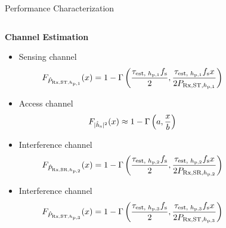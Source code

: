\documentclass[12pt]{beamer}
\newcommand{\fs}[2]{\fontsize{#1 pt}{#2}\selectfont}
\begin{document}
\begin{frame}{Performance Characterization}
        \vspace{-0.8cm}
        \fs{8}{8}
		\begin{columns}[t]
                \begin{column}{0.52 \paperwidth}
		\begin{center}	%
			\textbf{Channel Estimation} 
			\begin{itemize}
       		 	\fs{8}{8}
                	     \item Sensing channel
            		\vspace{-0.2cm}     
			\begin{align*}
			    	 F_{\hat{P}_{\text{Rx,ST,$h_{\text{p,1}}$}}}(x) = 1 - \Gamma \left( \frac{\tau_{\text{est, $h_{\text{p,1}}$}} f_{\text{s}}}{2}, \frac{\tau_{\text{est, $h_{\text{p,1}}$}} f_{\text{s}} x}{2 P_{\text{Rx,ST,$h_{\text{p,1}}$}}} \right) 
		     	     \end{align*}
		     	\item Access channel	
            		\vspace{-0.2cm}     
                     	\begin{align*}
		   		F_{|\hat{h}_{\text{s}}|^2}(x) \approx 1 - \Gamma \left(a, \frac{x}{b} \right)   
		     	\end{align*}
		     	\item Interference channel	
            		\vspace{-0.2cm}     
                     	\begin{align*}
		   		F_{\hat{P}_{\text{Rx,SR,$h_{\text{p,2}}$}}}(x) = 1 - \Gamma \left( \frac{\tau_{\text{est, $h_{\text{p,2}}$}} f_{\text{s}}}{2}, \frac{\tau_{\text{est, $h_{\text{p,2}}$}} f_{\text{s}} x}{2 P_{\text{Rx,SR,$h_{\text{p,2}}$}}} \right) 
		     	\end{align*}
		     	\item Interference channel	
            		\vspace{-0.2cm}     
                     	\begin{align*}
		     		F_{\hat{P}_{\text{Rx,ST,$h_{\text{p,3}}$}}}(x) = 1 - \Gamma \left( \frac{\tau_{\text{est, $h_{\text{p,3}}$}} f_{\text{s}}}{2}, \frac{\tau_{\text{est, $h_{\text{p,3}}$}} f_{\text{s}} x}{2 P_{\text{Rx,ST,$h_{\text{p,3}}$}}} \right)
			\end{align*}
		\end{itemize}
	\end{center}		
	\end{column}
        \begin{column}{0.48 \paperwidth}
		\begin{center}		

\end{center}
\end{column}
\end{columns}
\end{frame}
\end{document}
